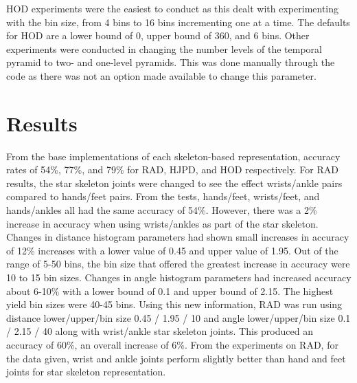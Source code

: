 \documentclass[11pt,nocopyrightspace]{config}
\begin{document}
HOD experiments were the easiest to conduct as this dealt with experimenting with the bin size, from 4 bins to 16 bins incrementing one at a time. The defaults for HOD are a lower bound of 0, upper bound of 360, and 6 bins. Other experiments were conducted in changing the number levels of the temporal pyramid to two- and one-level pyramids. This was done manually through the code as there was not an option made available to change this parameter.

\section{Results}

From the base implementations of each skeleton-based representation, accuracy rates of 54\%, 77\%, and 79\% for RAD, HJPD, and HOD respectively. For RAD results, the star skeleton joints were changed to see the effect wrists/ankle pairs compared to hands/feet pairs. From the tests, hands/feet, wrists/feet, and hands/ankles all had the same accuracy of 54\%. However, there was a 2\% increase in accuracy when using wrists/ankles as part of the star skeleton. Changes in distance histogram parameters had shown small increases in accuracy of 12\% increases with a lower value of 0.45 and upper value of 1.95. Out of the range of 5-50 bins, the bin size that offered the greatest increase in accuracy were 10 to 15 bin sizes. Changes in angle histogram parameters had increased accuracy about 6-10\% with a lower bound of 0.1 and upper bound of 2.15. The highest yield bin sizes were 40-45 bins. Using this new information, RAD was run using distance lower/upper/bin size 0.45 / 1.95 / 10 and angle lower/upper/bin size 0.1 / 2.15 / 40 along with wrist/ankle star skeleton joints. This produced an accuracy of 60\%, an overall increase of 6\%. From the experiments on RAD, for the data given, wrist and ankle joints perform slightly better than hand and feet joints for star skeleton representation.
\end{document}

